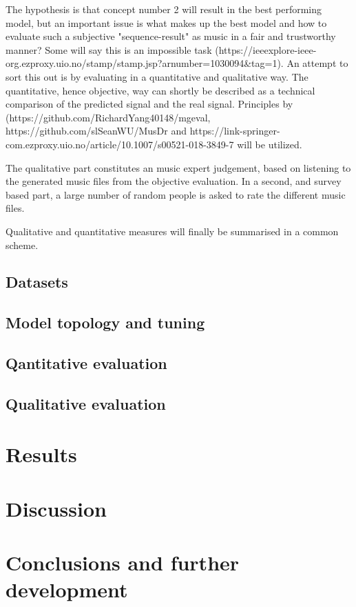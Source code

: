 \documentclass{article}
\begin{document}
        The hypothesis is that concept number 2 will result in the best performing model, but an important issue is what makes up the best model and how to evaluate such a subjective "sequence-result" as music in a fair and trustworthy manner? Some will say this is an impossible task (https://ieeexplore-ieee-org.ezproxy.uio.no/stamp/stamp.jsp?arnumber=1030094&tag=1). An attempt to sort this out is by evaluating in a quantitative and qualitative way. The quantitative, hence objective, way can shortly be described as a technical comparison of the predicted signal and the real signal. Principles by (https://github.com/RichardYang40148/mgeval, https://github.com/slSeanWU/MusDr and https://link-springer-com.ezproxy.uio.no/article/10.1007/s00521-018-3849-7 will be utilized.
        
        The qualitative part constitutes an music expert judgement, based on listening to the generated music files from the objective evaluation. In a second, and survey based part, a large number of random people is asked to rate the different music files.
        
        Qualitative and quantitative measures will finally be summarised in a common scheme.
        
    \subsection{Datasets}
    
    \subsection{Model topology and tuning}
    
    \subsection{Qantitative evaluation}
    
    \subsection{Qualitative evaluation}
    
    \section{Results}
    
    \section{Discussion}
    
    \section{Conclusions and further development}

    \printbibliography
\end{document}
